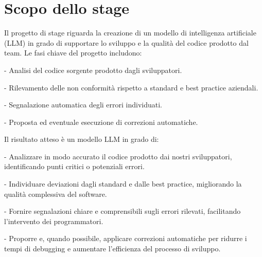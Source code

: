 \section*{Scopo dello stage}
Il progetto di stage riguarda la creazione di un modello di intelligenza artificiale (LLM) in grado di supportare lo sviluppo e la qualità del codice prodotto dal team. Le fasi chiave del progetto includono:

- Analisi del codice sorgente prodotto dagli sviluppatori.

- Rilevamento delle non conformità rispetto a standard e best practice aziendali.

-  Segnalazione automatica degli errori individuati.

- Proposta ed eventuale esecuzione di correzioni automatiche.

Il risultato atteso è un modello LLM in grado di:

- Analizzare in modo accurato il codice prodotto dai nostri sviluppatori, identificando punti critici o potenziali errori.

- Individuare deviazioni dagli standard e dalle best practice, migliorando la qualità complessiva del software.

- Fornire segnalazioni chiare e comprensibili sugli errori rilevati, facilitando l’intervento dei programmatori.

- Proporre e, quando possibile, applicare correzioni automatiche per ridurre i tempi di debugging e aumentare l’efficienza del processo di sviluppo.

